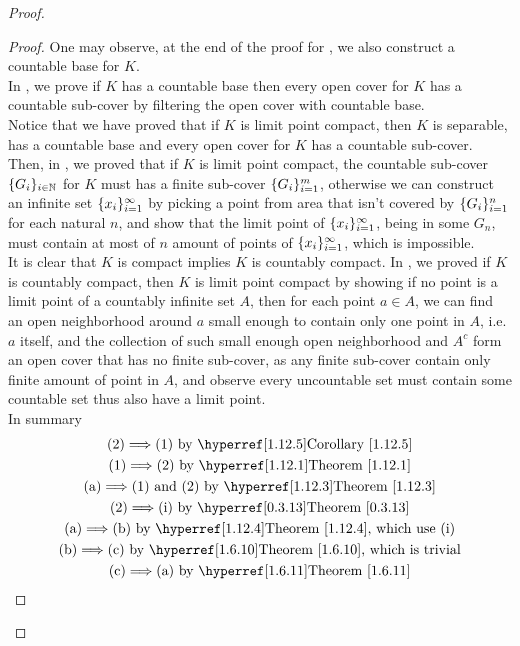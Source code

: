 \documentclass{report}
\begin{document}
\begin{proof}
\begin{proof}
One may observe, at the end of the proof for , we also construct a countable base for $K$.\\

In  , we prove if  $K$ has a countable base then every open cover for  $K$ has a countable sub-cover by filtering the open cover with countable base.\\

Notice that we have proved that if $K$ is limit point compact, then  $K$ is separable, has a countable base and every open cover for  $K$ has a countable sub-cover.\\

Then, in , we proved that if $K$ is limit point compact, the countable sub-cover $\{ G_i \}_{i\in\mathbb{N}}$ for $K$ must has a finite sub-cover $\{ G_i \}_{i=1}^m$, otherwise we can construct an infinite set $\{ x_i \}_{i=1}^\infty$ by picking a point from area that isn't covered by $\{ G_i \}_{i=1}^n$ for each natural $n$, and show that the limit point of $\{ x_i \}_{i=1}^\infty$, being in some $G_n$, must contain at most of  $n$ amount of points of  $\{ x_i \}_{i=1}^\infty$, which is impossible.\\

It is clear that $K$ is compact implies $K$ is countably compact. In  , we proved if $K$ is countably compact, then $K$ is limit point compact by showing if no point is a limit point of a countably infinite set $A$, then for each point $a\in A$, we can find an open neighborhood around $a$ small enough to contain only one point in $A$, i.e.  $a$ itself, and the collection of such small enough open neighborhood and  $A^c$ form an open cover that has no finite sub-cover, as any finite sub-cover contain only finite amount of point in  $A$, and observe every uncountable set must contain some countable set thus also have a limit point.\\

In summary 
\begin{gather}
\text{(2)$\implies $(1) by \myref{Corollary}{1.12.5}}\\
\text{(1)$\implies $(2) by \myref{Theorem}{1.12.1}}\\
\text{(a)$\implies $(1) and (2) by \myref{Theorem}{1.12.3}}\\
\text{(2)$\implies $(i) by \myref{Theorem}{0.3.13}}\\
\text{(a)$\implies $(b) by \myref{Theorem}{1.12.4}, which use  (i)}\\
\text{(b)$\implies$(c) by \myref{Theorem}{1.6.10}, which is trivial}\\
\text{(c)$\implies $(a) by \myref{Theorem}{1.6.11}}
\end{gather}
\end{proof}

\end{proof}
\end{document}
